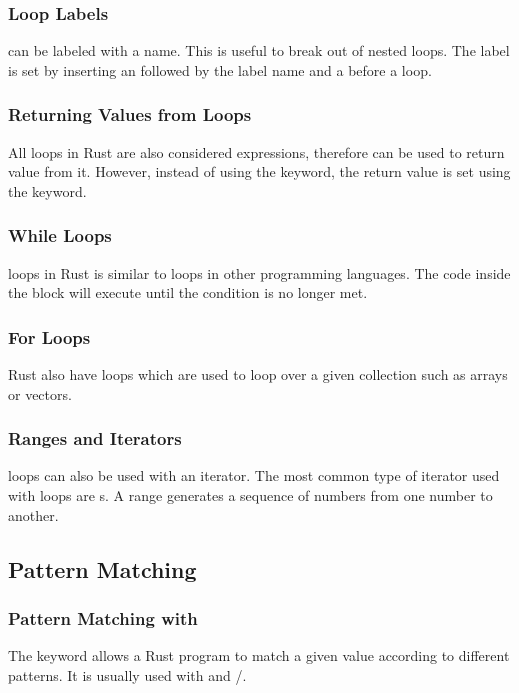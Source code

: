 \documentclass{beamer}
\begin{document}
\begin{frame}[allowframebreaks]
  \frametitle{Loop Labels}
   can be labeled with a name. This is useful to break out of nested loops. The label is set by inserting an  followed by the label name and a \inlinecode{:} before a loop.
  
\end{frame}

\begin{frame}
  \frametitle{Returning Values from Loops}
  All loops in Rust are also considered expressions, therefore can be used to return value from it. However, instead of using the  keyword, the return value is set using the  keyword.
  
\end{frame}

\begin{frame}
  \frametitle{While Loops}
   loops in Rust is similar to  loops in other programming languages. The code inside the block will execute until the condition is no longer met.
  
\end{frame}

\begin{frame}
  \frametitle{For Loops}
  Rust also have  loops which are used to loop over a given collection such as arrays or vectors.
  
\end{frame}

\begin{frame}
  \frametitle{Ranges and Iterators}
   loops can also be used with an iterator. The most common type of iterator used with  loops are s. A range generates a sequence of numbers from one number to another.
  
\end{frame}

\subsection{Pattern Matching}
\begin{frame}
  \frametitle{Pattern Matching with }
  The  keyword allows a Rust program to match a given value according to different patterns. It is usually used with  and /.
  
\end{frame}
\end{document}
